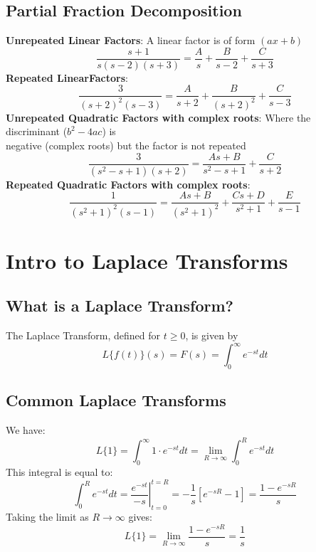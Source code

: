 \documentclass[a4paper, 10pt]{article}
\begin{document}
\subsection{Partial Fraction Decomposition}
\textbf{Unrepeated Linear Factors}: A linear factor is of form $(ax + b)$
$$\frac{s + 1}{s(s-2)(s+3)} = \frac{A}{s} + \frac{B}{s-2} + \frac{C}{s+3}$$
\textbf{Repeated LinearFactors}:
$$\frac{3}{(s+2)^2(s-3)} = \frac{A}{s+2} + \frac{B}{(s+2)^2} + \frac{C}{s-3}$$
\textbf{Unrepeated Quadratic Factors with complex roots}: Where the discriminant ($b^2 - 4ac$) is \\
\indent negative (complex roots) but the factor is not repeated
$$\frac{3}{(s^2 - s + 1)(s+2)} = \frac{As + B}{s^2 - s + 1} + \frac{C}{s+2}$$
\textbf{Repeated Quadratic Factors with complex roots}:
$$\frac{1}{(s^2 + 1)^2 (s-1)} = \frac{As + B}{(s^2 + 1)^2} + \frac{Cs + D}{s^2 + 1} + \frac{E}{s-1}$$


\pagebreak
\section{Intro to Laplace Transforms}
\subsection{What is a Laplace Transform?}
\begin{definitionbox}
  The Laplace Transform, defined for $t \geq 0$, is given by
  $$L\{f(t)\}(s) = F(s) = \int_0^\infty e^{-st} dt$$

\end{definitionbox}

\subsection{Common Laplace Transforms}

\begin{examplebox}[Find the Laplace Transform of \boldmath$f(t) = 1$]
  We have:
  $$L\{1\} = \int_0^\infty 1 \cdot e^{-st } dt = \lim_{R \to \infty} \int_0^R e^{-st} dt$$
  This integral is equal to:
  $$\int_0^R e^{-st} dt = \left . \frac{e^{-st}}{-s}\right |_{t=0}^{t=R}
    = -\frac{1}{s}[e^{-sR} - 1] = \frac{1 - e^{-sR}}{s}$$
  Taking the limit as $R \to \infty$ gives:
  $$L\{1\} = \lim_{R \to \infty} \frac{1 - e^{-sR}}{s} = \frac{1}{s}$$
\end{examplebox}
\end{document}
